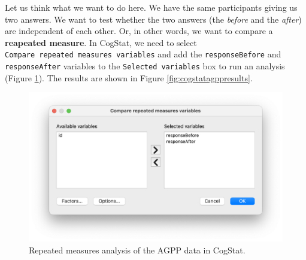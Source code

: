 \documentclass[
]{book}
\theoremstyle{definition}
\theoremstyle{definition}
\theoremstyle{definition}
\theoremstyle{definition}
\theoremstyle{remark}
\begin{document}
Let us think what we want to do here. We have the same participants giving us two answers. We want to test whether the two answers (the \emph{before} and the \emph{after}) are independent of each other. Or, in other words, we want to compare a \textbf{reapeated measure}. In CogStat, we need to select \texttt{Compare\ repeated\ measures\ variables} and add the \texttt{responseBefore} and \texttt{responseAfter} variables to the \texttt{Selected\ variables} box to run an analysis (Figure \ref{fig:cogstatrepeatagpp}). The results are shown in Figure \ref{fig:cogstatagppresults}.

\begin{figure}

{\centering \includegraphics[width=0.66\linewidth]{resources/image/cogstatrepeatagpp} 

}

\caption{Repeated measures analysis of the AGPP data in CogStat.}\label{fig:cogstatrepeatagpp}
\end{figure}
\end{document}
